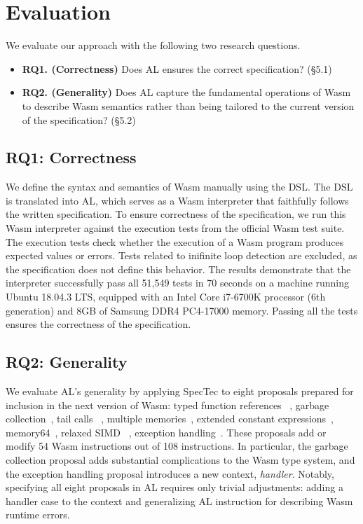
\chapter{Evaluation}
\label{ch:eval}
\noindent

We evaluate our approach with the following two research questions.
\begin{itemize}
  \item \textbf{RQ1. (Correctness)} Does AL ensures the correct specification?
    (\S 5.1)
  \item \textbf{RQ2. (Generality)} Does AL capture the fundamental operations of
    Wasm to describe Wasm semantics rather than being tailored to the current
    version of the specification? (\S 5.2)
\end{itemize}

\section{RQ1: Correctness}

We define the syntax and semantics of Wasm manually using the DSL.
The DSL is translated into AL, which serves as a Wasm interpreter that
faithfully follows the written specification.
To ensure correctness of the specification, we run this Wasm interpreter
against the execution tests from the official Wasm test suite.
The execution tests check whether the execution of a Wasm program produces
expected values or errors.
Tests related to inifinite loop detection are excluded, as the specification
does not define this behavior.
The results demonstrate that the interpreter successfully pass all 51,549 tests
in 70 seconds on a machine running Ubuntu 18.04.3 LTS, equipped with an Intel
Core i7-6700K processor (6th generation) and 8GB of Samsung DDR4 PC4-17000
memory.
Passing all the tests ensures the correctness of the specification.


\section{RQ2: Generality}
We evaluate AL's generality by applying SpecTec to eight proposals prepared for
inclusion in the next version of Wasm: typed function references
~\cite{proposal-fr}, garbage collection~\cite{proposal-gc}, tail calls
~\cite{proposal-tc}, multiple memories~\cite{proposal-mm}, extended constant
expressions~\cite{proposal-ec}, memory64~\cite{proposal-m64}, relaxed SIMD
~\cite{proposal-rs}, exception handling~\cite{proposal-eh}.
These proposals add or modify 54 Wasm instructions out of 108 instructions.
In particular, the garbage collection proposal adds substantial complications
to the Wasm type system, and the exception handling proposal introduces a new
context, \textit{handler}.
Notably, specifying all eight proposals in AL requires only trivial
adjustments: adding a handler case to the context and generalizing AL
instruction for describing Wasm runtime errors.

